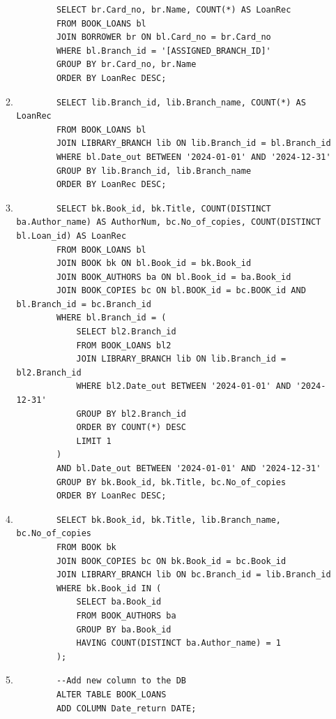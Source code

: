 \documentclass[12pt,a4paper]{article}
\begin{document}
\begin{enumerate}
\begin{enumerate}
\begin{verbatim}
        SELECT br.Card_no, br.Name, COUNT(*) AS LoanRec
        FROM BOOK_LOANS bl
        JOIN BORROWER br ON bl.Card_no = br.Card_no
        WHERE bl.Branch_id = '[ASSIGNED_BRANCH_ID]'
        GROUP BY br.Card_no, br.Name
        ORDER BY LoanRec DESC;
        \end{verbatim}
        \item
        \begin{verbatim}
        SELECT lib.Branch_id, lib.Branch_name, COUNT(*) AS LoanRec
        FROM BOOK_LOANS bl
        JOIN LIBRARY_BRANCH lib ON lib.Branch_id = bl.Branch_id
        WHERE bl.Date_out BETWEEN '2024-01-01' AND '2024-12-31'
        GROUP BY lib.Branch_id, lib.Branch_name
        ORDER BY LoanRec DESC;
        \end{verbatim}
        \item
        \begin{verbatim}
        SELECT bk.Book_id, bk.Title, COUNT(DISTINCT ba.Author_name) AS AuthorNum, bc.No_of_copies, COUNT(DISTINCT bl.Loan_id) AS LoanRec
        FROM BOOK_LOANS bl
        JOIN BOOK bk ON bl.Book_id = bk.Book_id
        JOIN BOOK_AUTHORS ba ON bl.Book_id = ba.Book_id
        JOIN BOOK_COPIES bc ON bl.BOOK_id = bc.BOOK_id AND bl.Branch_id = bc.Branch_id
        WHERE bl.Branch_id = (
            SELECT bl2.Branch_id
            FROM BOOK_LOANS bl2
            JOIN LIBRARY_BRANCH lib ON lib.Branch_id = bl2.Branch_id
            WHERE bl2.Date_out BETWEEN '2024-01-01' AND '2024-12-31'
            GROUP BY bl2.Branch_id
            ORDER BY COUNT(*) DESC
            LIMIT 1
        )
        AND bl.Date_out BETWEEN '2024-01-01' AND '2024-12-31'
        GROUP BY bk.Book_id, bk.Title, bc.No_of_copies
        ORDER BY LoanRec DESC;
        \end{verbatim}

        \item
        \begin{verbatim}
        SELECT bk.Book_id, bk.Title, lib.Branch_name, bc.No_of_copies
        FROM BOOK bk
        JOIN BOOK_COPIES bc ON bk.Book_id = bc.Book_id
        JOIN LIBRARY_BRANCH lib ON bc.Branch_id = lib.Branch_id
        WHERE bk.Book_id IN (
            SELECT ba.Book_id
            FROM BOOK_AUTHORS ba
            GROUP BY ba.Book_id
            HAVING COUNT(DISTINCT ba.Author_name) = 1
        );
        \end{verbatim}
        \item
        \begin{verbatim}
        --Add new column to the DB
        ALTER TABLE BOOK_LOANS
        ADD COLUMN Date_return DATE;


\end{verbatim}
\end{enumerate}
\end{enumerate}
\end{document}
